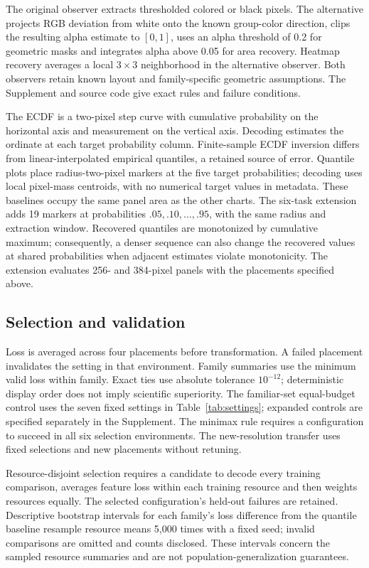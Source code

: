 \documentclass[11pt]{article}
\begin{document}
The original observer extracts thresholded colored or black pixels. The alternative projects RGB deviation from white onto the known group-color direction, clips the resulting alpha estimate to $[0,1]$, uses an alpha threshold of 0.2 for geometric masks and integrates alpha above 0.05 for area recovery. Heatmap recovery averages a local $3\times3$ neighborhood in the alternative observer. Both observers retain known layout and family-specific geometric assumptions. The Supplement and source code give exact rules and failure conditions.

The ECDF is a two-pixel step curve with cumulative probability on the horizontal axis and measurement on the vertical axis. Decoding estimates the ordinate at each target probability column. Finite-sample ECDF inversion differs from linear-interpolated empirical quantiles, a retained source of error. Quantile plots place radius-two-pixel markers at the five target probabilities; decoding uses local pixel-mass centroids, with no numerical target values in metadata. These baselines occupy the same panel area as the other charts. The six-task extension adds 19 markers at probabilities $.05,.10,\ldots,.95$, with the same radius and extraction window. Recovered quantiles are monotonized by cumulative maximum; consequently, a denser sequence can also change the recovered values at shared probabilities when adjacent estimates violate monotonicity. The extension evaluates 256- and 384-pixel panels with the placements specified above.

\subsection*{Selection and validation}
Loss is averaged across four placements before transformation. A failed placement invalidates the setting in that environment. Family summaries use the minimum valid loss within family. Exact ties use absolute tolerance $10^{-12}$; deterministic display order does not imply scientific superiority. The familiar-set equal-budget control uses the seven fixed settings in Table~\ref{tab:settings}; expanded controls are specified separately in the Supplement. The minimax rule requires a configuration to succeed in all six selection environments. The new-resolution transfer uses fixed selections and new placements without retuning.

Resource-disjoint selection requires a candidate to decode every training comparison, averages feature loss within each training resource and then weights resources equally. The selected configuration's held-out failures are retained. Descriptive bootstrap intervals for each family's loss difference from the quantile baseline resample resource means 5,000 times with a fixed seed; invalid comparisons are omitted and counts disclosed. These intervals concern the sampled resource summaries and are not population-generalization guarantees.
\end{document}
